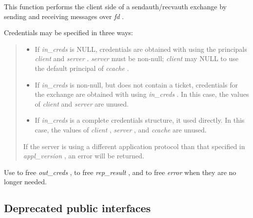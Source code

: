 \documentclass[letterpaper,10pt,english]{sphinxmanual}
\begin{document}
This function performs the client side of a sendauth/recvauth exchange by sending and receiving messages over \emph{fd} .

Credentials may be specified in three ways:
\begin{quote}
\begin{itemize}
\item {} 
If \emph{in\_creds} is NULL, credentials are obtained with {\hyperref[appdev/refs/api/krb5_get_credentials:krb5_get_credentials]{}} using the principals \emph{client} and \emph{server} . \emph{server} must be non-null; \emph{client} may NULL to use the default principal of \emph{ccache} .

\item {} 
If \emph{in\_creds} is non-null, but does not contain a ticket, credentials for the exchange are obtained with {\hyperref[appdev/refs/api/krb5_get_credentials:krb5_get_credentials]{}} using \emph{in\_creds} . In this case, the values of \emph{client} and \emph{server} are unused.

\item {} 
If \emph{in\_creds} is a complete credentials structure, it used directly. In this case, the values of \emph{client} , \emph{server} , and \emph{ccache} are unused.

\end{itemize}

If the server is using a different application protocol than that specified in \emph{appl\_version} , an error will be returned.
\end{quote}

Use {\hyperref[appdev/refs/api/krb5_free_creds:krb5_free_creds]{}} to free \emph{out\_creds} , {\hyperref[appdev/refs/api/krb5_free_ap_rep_enc_part:krb5_free_ap_rep_enc_part]{}} to free \emph{rep\_result} , and {\hyperref[appdev/refs/api/krb5_free_error:krb5_free_error]{}} to free \emph{error} when they are no longer needed.




{\hyperref[appdev/refs/api/krb5_recvauth:krb5_recvauth]{}}




\subsection{Deprecated public interfaces}
\label{appdev/refs/api/index:deprecated-public-interfaces}
\end{document}
